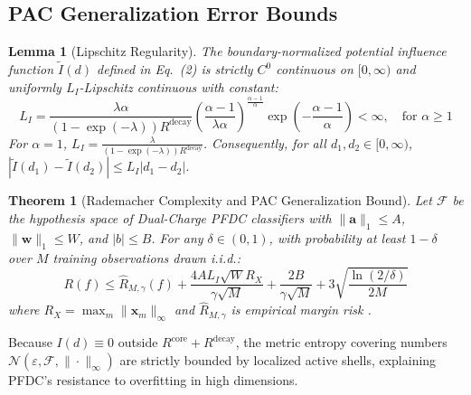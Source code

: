 \documentclass[preprint,review,12pt]{elsarticle}
\newtheorem{theorem}{Theorem}
\newtheorem{lemma}{Lemma}
\begin{document}
\subsection{PAC Generalization Error Bounds}
\begin{lemma}[Lipschitz Regularity]
The boundary-normalized potential influence function $\tilde{I}(d)$ defined in Eq.~(2) is strictly $C^0$ continuous on $[0, \infty)$ and uniformly $L_I$-Lipschitz continuous with constant:
\begin{equation}
L_I = \frac{\lambda \alpha}{(1 - \exp(-\lambda)) R^{\mathrm{decay}}} \left(\frac{\alpha - 1}{\lambda \alpha}\right)^{\frac{\alpha - 1}{\alpha}} \exp\left(-\frac{\alpha - 1}{\alpha}\right) < \infty, \quad \text{for } \alpha \ge 1
\end{equation}
For $\alpha = 1$, $L_I = \frac{\lambda}{(1 - \exp(-\lambda)) R^{\mathrm{decay}}}$. Consequently, for all $d_1, d_2 \in [0, \infty)$, $|\tilde{I}(d_1) - \tilde{I}(d_2)| \le L_I |d_1 - d_2|$.
\end{lemma}

\begin{theorem}[Rademacher Complexity and PAC Generalization Bound]
\label{thm:rademacher}
Let $\mathcal{F}$ be the hypothesis space of Dual-Charge PFDC classifiers with $\|\mathbf{a}\|_1 \le A$, $\|\mathbf{w}\|_1 \le W$, and $|b| \le B$. For any $\delta \in (0, 1)$, with probability at least $1 - \delta$ over $M$ training observations drawn i.i.d.:
\begin{equation}
R(f) \le \hat{R}_{M,\gamma}(f) + \frac{4 A L_I \sqrt{W} R_X}{\gamma \sqrt{M}} + \frac{2 B}{\gamma \sqrt{M}} + 3 \sqrt{\frac{\ln(2/\delta)}{2M}}
\end{equation}
where $R_X = \max_m \|\mathbf{x}_m\|_\infty$ and $\hat{R}_{M,\gamma}$ is empirical margin risk \cite{bartlett2002rademacher}.
\end{theorem}
Because $I(d) \equiv 0$ outside $R^{\mathrm{core}} + R^{\mathrm{decay}}$, the metric entropy covering numbers $\mathcal{N}(\varepsilon, \mathcal{F}, \|\cdot\|_\infty)$ are strictly bounded by localized active shells, explaining PFDC's resistance to overfitting in high dimensions.
\end{document}
